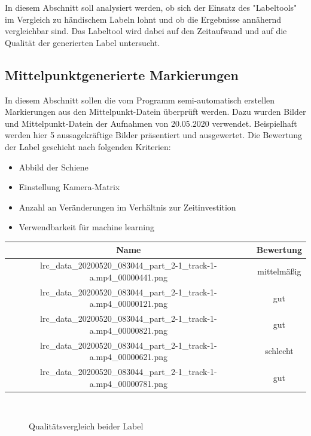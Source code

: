 \documentclass[11pt]{scrartcl}
\begin{document}
\noindent
In diesem Abschnitt soll analysiert werden, ob sich der Einsatz des "Labeltools" im Vergleich zu händischem Labeln lohnt und ob die Ergebnisse annähernd vergleichbar sind. Das Labeltool wird dabei auf den Zeitaufwand und auf die Qualität der generierten Label untersucht.
\noindent
\subsection{Mittelpunktgenerierte Markierungen}
\label{sec:Mittelpunkt Generierung}

\noindent
In diesem Abschnitt sollen die vom Programm semi-automatisch erstellen Markierungen aus den Mittelpunkt-Datein überprüft werden. Dazu wurden Bilder und Mittelpunkt-Datein der Aufnahmen von 20.05.2020 verwendet. Beispielhaft werden hier 5 aussagekräftige Bilder präsentiert und ausgewertet. Die Bewertung der Label geschieht nach folgenden Kriterien:
\\

\noindent
\begin{itemize}
	\item Abbild der Schiene
	\item Einstellung Kamera-Matrix
	\item Anzahl an Veränderungen im Verhältnis zur Zeitinvestition
	\item Verwendbarkeit für machine learning
\end{itemize}

\begin{tabular}[h]{c|c}
Name & Bewertung  \\
\hline
lrc\_data\_20200520\_083044\_part\_2-1\_track-1-a.mp4\_00000441.png & mittelmäßig \\
lrc\_data\_20200520\_083044\_part\_2-1\_track-1-a.mp4\_00000121.png &  gut \\
lrc\_data\_20200520\_083044\_part\_2-1\_track-1-a.mp4\_00000821.png &  gut\\
lrc\_data\_20200520\_083044\_part\_2-1\_track-1-a.mp4\_00000621.png & schlecht  \\
lrc\_data\_20200520\_083044\_part\_2-1\_track-1-a.mp4\_00000781.png & gut  \\
\end{tabular}
\\ 

\noindent
\begin{figure}[h]
    \subfigure[00000441.png]{\texttt{[image: 441]}}
    \subfigure[00000121.png]{\texttt{[image: 121]}}
\subfigure[00000821.png]{\texttt{[image: 821]}}
\subfigure[00000621.png]{\texttt{[image: 621]}}
\subfigure[00000781]{\texttt{[image: 781]}}
\caption{Qualitätsvergleich beider Label}
\end{figure}
\\
\end{document}
